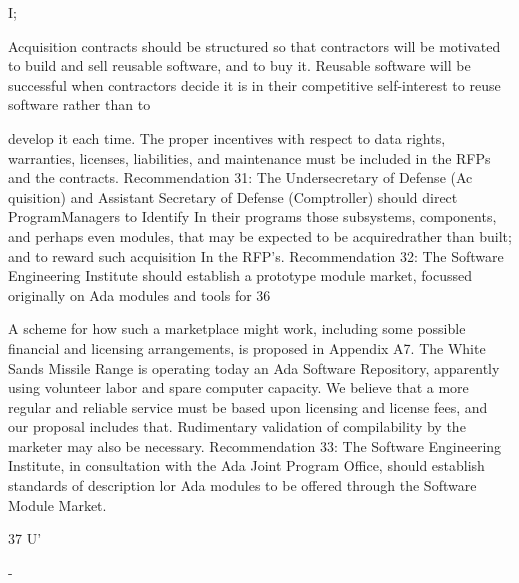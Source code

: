 \documentclass[12pt]{article}
\begin{document}
I;

Acquisition contracts should be structured so that contractors will be motivated to
build and sell reusable software, and to buy it. Reusable software will be successful when
contractors decide it is in their competitive self-interest to reuse software rather than to

develop it each time. The proper incentives with respect to data rights, warranties, licenses,
liabilities, and maintenance must be included in the RFPs and the contracts.
Recommendation 31: The Undersecretary of Defense (Ac quisition) and
Assistant Secretary of Defense (Comptroller) should direct ProgramManagers
to Identify In their programs those subsystems, components, and perhaps even
modules, that may be expected to be acquiredrather than built; and to reward
such acquisition In the RFP's.
Recommendation 32: The Software Engineering Institute should establish
a prototype module market, focussed originally on Ada modules and tools for
36

A scheme for how such a marketplace might work, including some possible financial
and licensing arrangements, is proposed in Appendix A7.
The White Sands Missile Range is operating today an Ada Software Repository,
apparently using volunteer labor and spare computer capacity. We believe that a more
regular and reliable service must be based upon licensing and license fees, and our proposal
includes that. Rudimentary validation of compilability by the marketer may also be
necessary.
Recommendation 33: The Software Engineering Institute, in consultation
with the Ada Joint Program Office, should establish standards of description
lor Ada modules to be offered through the Software Module Market.

37
U'

-
\end{document}
